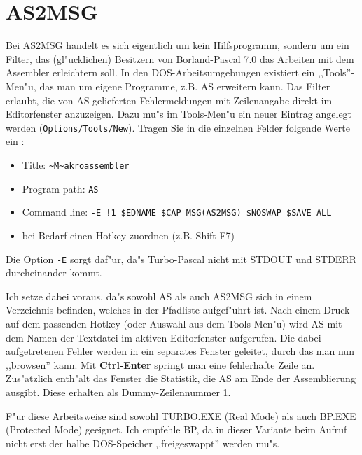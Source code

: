 \documentclass[12pt,a4paper,twoside]{report}
\newcommand{\bb}[1]{{\bf #1}}
\newcommand{\tty}[1]{{\tt #1}}
\begin{document}

\section{AS2MSG}

Bei AS2MSG handelt es sich eigentlich um kein Hilfsprogramm, sondern um ein
Filter, das (gl"ucklichen) Besitzern von Borland-Pascal 7.0 das Arbeiten
mit dem Assembler erleichtern soll.  In den DOS-Arbeitsumgebungen existiert
ein ,,Tools''-Men"u, das man um eigene Programme, z.B. AS erweitern kann.
Das Filter erlaubt, die von AS gelieferten Fehlermeldungen mit Zeilenangabe
direkt im Editorfenster anzuzeigen.  Dazu mu"s im Tools-Men"u ein neuer
Eintrag angelegt werden (\tty{Options/Tools/New}).  Tragen Sie in die
einzelnen Felder folgende Werte ein :
\begin{itemize}
\item{Title: {\tt \verb!~!M\verb!~!akroassembler}}
\item{Program path: \tty{AS}}
\item{Command line: \tty{-E !1 \$EDNAME \$CAP MSG(AS2MSG) \$NOSWAP \$SAVE
ALL}}
\item{bei Bedarf einen Hotkey zuordnen (z.B. Shift-F7)}
\end{itemize}
Die Option \tty{-E} sorgt daf"ur, da"s Turbo-Pascal nicht mit STDOUT und
STDERR durcheinander kommt.
\par
Ich setze dabei voraus, da"s sowohl AS als auch AS2MSG sich in einem
Verzeichnis befinden, welches in der Pfadliste aufgef"uhrt ist.  Nach einem
Druck auf dem passenden Hotkey (oder Auswahl aus dem Tools-Men"u) wird AS mit
dem Namen der Textdatei im aktiven Editorfenster aufgerufen.  Die dabei
aufgetretenen Fehler werden in ein separates Fenster geleitet, durch das man
nun ,,browsen'' kann.  Mit \bb{Ctrl-Enter} springt man eine fehlerhafte
Zeile an.  Zus"atzlich enth"alt das Fenster die Statistik, die AS am Ende
der Assemblierung ausgibt.  Diese erhalten als Dummy-Zeilennummer 1.
\par
F"ur diese Arbeitsweise sind sowohl TURBO.EXE (Real Mode) als auch BP.EXE
(Protected Mode) geeignet.  Ich empfehle BP, da in dieser Variante beim
Aufruf nicht erst der halbe DOS-Speicher ,,freigeswappt'' werden mu"s.

\cleardoublepage

\appendix

\end{document}
